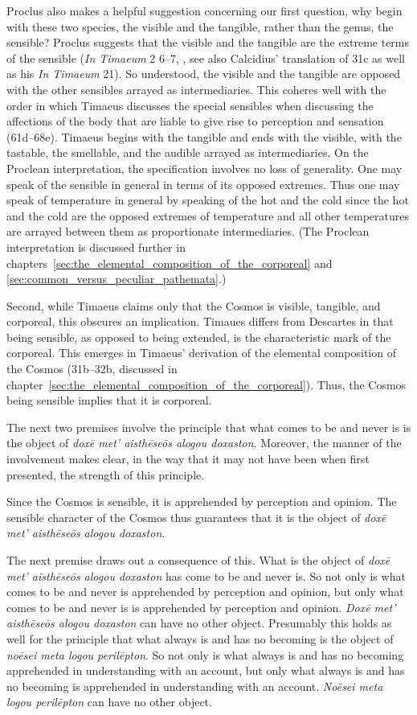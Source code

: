 Proclus also makes a helpful suggestion concerning our first question, why begin with these two species, the visible and the tangible, rather than the genus, the sensible? Proclus suggests that the visible and the tangible are the extreme terms of the sensible (\emph{In Timaeum} 2 6--7, \citealt{Diehl:1903re}, see also Calcidius' translation of 31c as well as his \emph{In Timaeum} 21). So understood, the visible and the tangible are opposed with the other sensibles arrayed as intermediaries. This coheres well with the order in which Timaeus discusses the special sensibles when discussing the affections of the body that are liable to give rise to perception and sensation (61d--68e). Timaeus begins with the tangible and ends with the visible, with the tastable, the smellable, and the audible arrayed as intermediaries. On the Proclean interpretation, the specification involves no loss of generality. One may speak of the sensible in general in terms of its opposed extremes. Thus one may speak of temperature in general by speaking of the hot and the cold since the hot and the cold are the opposed extremes of temperature and all other temperatures are arrayed between them as proportionate intermediaries. (The Proclean interpretation is discussed further in chapters~\ref{sec:the_elemental_composition_of_the_corporeal} and \ref{sec:common_versus_peculiar_pathemata}.)

Second, while Timaeus claims only that the Cosmos is visible, tangible, and corporeal, this obscures an implication. Timaues differs from Descartes in that being sensible, as opposed to being extended, is the characteristic mark of the corporeal. This emerges in Timaeus' derivation of the elemental composition of the Cosmos (31b--32b, discussed in chapter~\ref{sec:the_elemental_composition_of_the_corporeal}). Thus, the  Cosmos being sensible implies that it is corporeal.

The next two premises involve the principle that what comes to be and never is is the object of \emph{doxē met’ aisthēseōs alogou doxaston}. Moreover, the manner of the involvement makes clear, in the way that it may not have been when first presented, the strength of this principle.

Since the Cosmos is sensible, it is apprehended by perception and opinion. The sensible character of the Cosmos thus guarantees that it is the object of \emph{doxē met’ aisthēseōs alogou doxaston}. 

The next premise draws out a consequence of this. What is the object of \emph{doxē met’ aisthēseōs alogou doxaston} has come to be and never is. So not only is what comes to be and never is apprehended by perception and opinion, but only what comes to be and never is is apprehended by perception and opinion. \emph{Doxē met’ aisthēseōs alogou doxaston} can have no other object. Presumably this holds as well for the principle that what always is and has no becoming is the object of \emph{noēsei meta logou perilēpton}. So not only is what always is and has no becoming apprehended in understanding with an account, but only what always is and has no becoming is apprehended in understanding with an account. \emph{Noēsei meta logou perilēpton} can have no other object.

